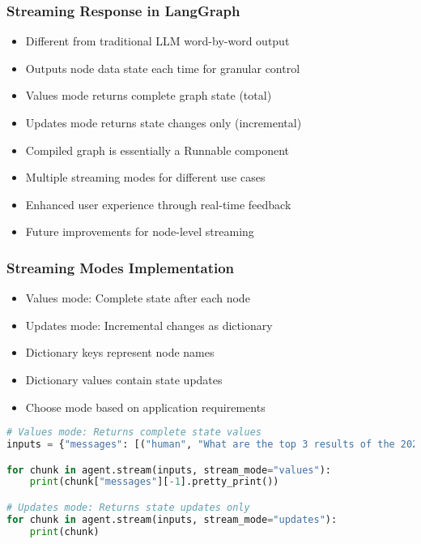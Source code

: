 \begin{frame}[fragile]\frametitle{Streaming Response in LangGraph}
      \begin{itemize}
        \item Different from traditional LLM word-by-word output
        \item Outputs node data state each time for granular control
        \item Values mode returns complete graph state (total)
        \item Updates mode returns state changes only (incremental)
        \item Compiled graph is essentially a Runnable component
        \item Multiple streaming modes for different use cases
        \item Enhanced user experience through real-time feedback
        \item Future improvements for node-level streaming
      \end{itemize}
\end{frame}

\begin{frame}[fragile]\frametitle{Streaming Modes Implementation}
      \begin{itemize}
        \item Values mode: Complete state after each node
        \item Updates mode: Incremental changes as dictionary
        \item Dictionary keys represent node names
        \item Dictionary values contain state updates
        \item Choose mode based on application requirements
      \end{itemize}
      \begin{lstlisting}[language=Python, basicstyle=\small]
# Values mode: Returns complete state values
inputs = {"messages": [("human", "What are the top 3 results of the 2024 Beijing Half Marathon?")]}

for chunk in agent.stream(inputs, stream_mode="values"):
    print(chunk["messages"][-1].pretty_print())

# Updates mode: Returns state updates only
for chunk in agent.stream(inputs, stream_mode="updates"):
    print(chunk)
      \end{lstlisting}

\end{frame}


